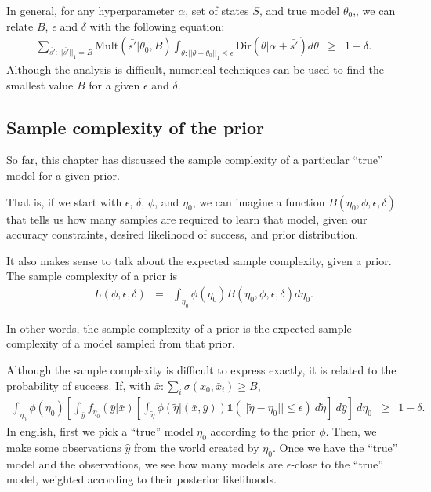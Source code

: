 In general, for any hyperparameter $\alpha$, set of states $S$, and true model $\theta_0$,, we can relate $B$, $\epsilon$ and $\delta$ with the following equation:
\begin{eqnarray}
\sum_{\bar {s'}:||\bar {s'}||_1 = B} \limits
 \mbox{Mult}(\bar {s'}|\theta_0,B)
 \int_{\theta:||\theta-\theta_0||_1 \leq \epsilon}\limits
  \mbox{Dir}(\theta|\alpha+\bar{s'})
  d\theta
&\geq& 1-\delta.
\end{eqnarray}
Although the analysis is difficult, numerical techniques can be used to find the smallest value $B$ for a given $\epsilon$ and $\delta$.

\subsection{Sample complexity of the prior}

So far, this chapter has discussed the sample complexity of a particular ``true'' model for a given prior.

That is, if we start with $\epsilon$, $\delta$, $\phi$, and $\eta_0$, we can imagine a function $B(\eta_0,\phi,\epsilon,\delta)$ that tells us how many samples are required to learn that model, given our accuracy constraints, desired likelihood of success, and prior distribution.

It also makes sense to talk about the expected sample complexity, given a prior. The sample complexity of a prior is
\begin{eqnarray}
L(\phi,\epsilon,\delta)
&=&
\int_{\eta_0} \phi(\eta_0) B(\eta_0,\phi,\epsilon,\delta) d\eta_0.
\end{eqnarray}

In other words, the sample complexity of a prior is the expected sample complexity of a model sampled from that prior.

Although the sample complexity is difficult to express exactly, it is related to the probability of success. If, with $\bar x:\sum_i \sigma(x_0,{\bar x}_i)\geq B$,
\begin{eqnarray}
\label{sec:guarantees:prior-learnability}
\int_{\eta_0}\limits
 \phi(\eta_0) \left[
 \int_{\bar y} \limits
  f_{\eta_0}(\bar y|\bar x) \left[
  \int_{\tilde\eta}\limits
   \phi(\tilde\eta|(\bar x, \bar y))
   \mathbb{1}(||\tilde\eta-\eta_0||\leq\epsilon)
  \ d\tilde\eta \right]
 \ d\bar y \right]
\ d\eta_0
&\geq&
1-\delta.
\end{eqnarray}
In english, first we pick a ``true'' model $\eta_0$ according to the prior $\phi$. Then, we make some observations $\hat y$ from the world created by $\eta_0$. Once we have the ``true'' model and the observations, we see how many models are $\epsilon$-close to the ``true'' model, weighted according to their posterior likelihoods.


